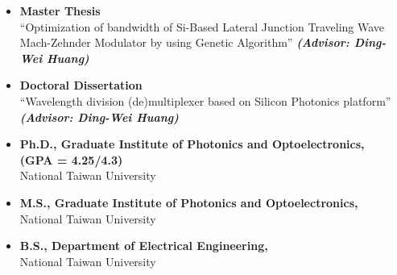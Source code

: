 \documentclass[10pt,a4paper,ragged2e]{altacv}
\begin{document}
\begin{itemize}
\justifying
\item {\large \textbf{Master Thesis}}\\
        {\normalsize ``Optimization of bandwidth of Si-Based Lateral Junction Traveling Wave Mach-Zehnder Modulator by using Genetic Algorithm'' \bf\textit{(Advisor: Ding-Wei Huang)}}

\item {\large \textbf{Doctoral Dissertation}}\\
        {\normalsize ``Wavelength division (de)multiplexer based on Silicon Photonics platform'' \bf\textit{(Advisor: Ding-Wei Huang)}}
\end{itemize}


    \begin{itemize}
    \justifying
    \item \textbf{\normalsize Ph.D., Graduate Institute of Photonics and Optoelectronics, \\(GPA = 4.25/4.3)}\\
            \hspace{5em} \normalsize National Taiwan University \\
            \small{}
            \small{}
    \item \textbf{\normalsize M.S., Graduate Institute of Photonics and Optoelectronics,} \\
            \hspace{5em} \normalsize National Taiwan University \\
            \small{}
            \small{}
    \item \textbf{\normalsize B.S., Department of Electrical Engineering,} \\
            \hspace{5em} \normalsize National Taiwan University \\
            \small{}
            \small{}
    \end{itemize}
\end{document}
